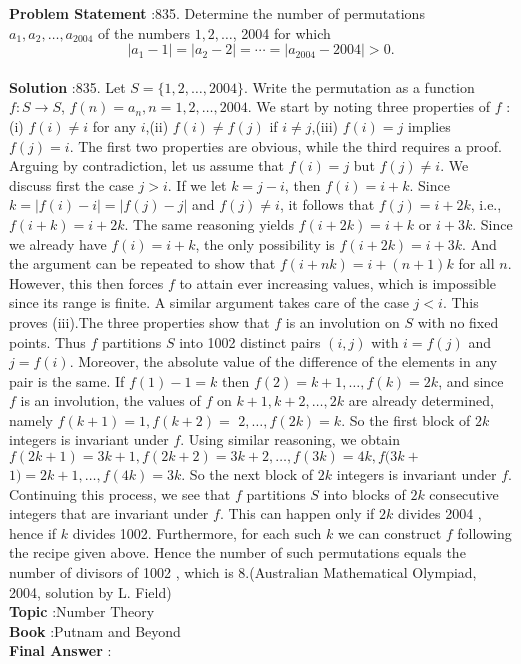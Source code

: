 \documentclass[10pt]{article}
\begin{document}
\textbf{Problem Statement} :835. Determine the number of permutations $a_{1}, a_{2}, \ldots, a_{2004}$ of the numbers $1,2, \ldots$, 2004 for which$$ \left|a_{1}-1\right|=\left|a_{2}-2\right|=\cdots=\left|a_{2004}-2004\right|>0 . $$\\
\textbf{Solution} :835. Let $S=\{1,2, \ldots, 2004\}$. Write the permutation as a function $f: S \rightarrow S$, $f(n)=a_{n}, n=1,2, \ldots, 2004$. We start by noting three properties of $f$ :(i) $f(i) \neq i$ for any $i$,(ii) $f(i) \neq f(j)$ if $i \neq j$,(iii) $f(i)=j$ implies $f(j)=i$. The first two properties are obvious, while the third requires a proof. Arguing by contradiction, let us assume that $f(i)=j$ but $f(j) \neq i$. We discuss first the case $j>i$. If we let $k=j-i$, then $f(i)=i+k$. Since $k=|f(i)-i|=|f(j)-j|$ and $f(j) \neq i$, it follows that $f(j)=i+2 k$, i.e., $f(i+k)=i+2 k$. The same reasoning yields $f(i+2 k)=i+k$ or $i+3 k$. Since we already have $f(i)=i+k$, the only possibility is $f(i+2 k)=i+3 k$. And the argument can be repeated to show that $f(i+n k)=i+(n+1) k$ for all $n$. However, this then forces $f$ to attain ever increasing values, which is impossible since its range is finite. A similar argument takes care of the case $j<i$. This proves (iii).The three properties show that $f$ is an involution on $S$ with no fixed points. Thus $f$ partitions $S$ into 1002 distinct pairs $(i, j)$ with $i=f(j)$ and $j=f(i)$. Moreover, the absolute value of the difference of the elements in any pair is the same. If $f(1)-1=k$ then $f(2)=k+1, \ldots, f(k)=2 k$, and since $f$ is an involution, the values of $f$ on $k+1, k+2, \ldots, 2 k$ are already determined, namely $f(k+1)=1, f(k+2)=$ $2, \ldots, f(2 k)=k$. So the first block of $2 k$ integers is invariant under $f$. Using similar reasoning, we obtain $f(2 k+1)=3 k+1, f(2 k+2)=3 k+2, \ldots, f(3 k)=4 k, f(3 k+$ $1)=2 k+1, \ldots, f(4 k)=3 k$. So the next block of $2 k$ integers is invariant under $f$. Continuing this process, we see that $f$ partitions $S$ into blocks of $2 k$ consecutive integers that are invariant under $f$. This can happen only if $2 k$ divides 2004 , hence if $k$ divides 1002. Furthermore, for each such $k$ we can construct $f$ following the recipe given above. Hence the number of such permutations equals the number of divisors of 1002 , which is 8.(Australian Mathematical Olympiad, 2004, solution by L. Field)\\
\textbf{Topic} :Number Theory\\
\textbf{Book} :Putnam and Beyond\\
\textbf{Final Answer} :\\
\end{document}
